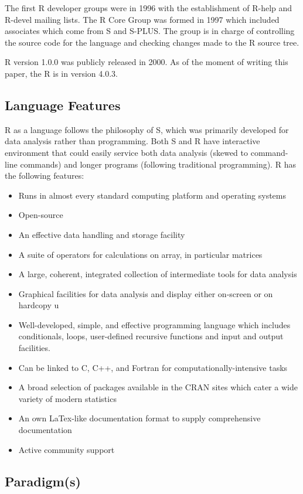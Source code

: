 \documentclass[12pt]{article}
\begin{document}
The first R developer groups were in 1996 with the establishment of R-help and R-devel mailing lists. The R Core Group was formed in 1997 which included associates which come from S and S-PLUS. The group is in charge of controlling the source code for the language and checking changes made to the R source tree.

R version 1.0.0 was publicly released in 2000. As of the moment of writing this paper, the R is in version 4.0.3.
\subsection{Language Features}
R as a language follows the philosophy of S, which was primarily developed for data analysis rather than programming. Both S and R have interactive environment that could easily service both data analysis (skewed to command-line commands) and longer programs (following traditional programming). R has the following features:
\begin{itemize}
\item Runs in almost every standard computing platform  and operating systems
\item Open-source
\item An effective data handling and storage facility
\item A suite of operators for calculations on array, in particular matrices
\item A large, coherent, integrated collection of intermediate tools for data analysis
\item Graphical facilities for data analysis and display either on-screen or on hardcopy u
\item Well-developed, simple, and effective programming language which includes conditionals, loops, user-defined recursive functions and input and output facilities.
\item Can be linked to C, C++, and Fortran for computationally-intensive tasks
\item A broad selection of packages available in the CRAN sites which cater a wide variety of modern statistics
\item An own LaTex-like documentation format to supply comprehensive documentation
\item Active community support
\end{itemize}

\subsection{Paradigm(s)}
\end{document}
